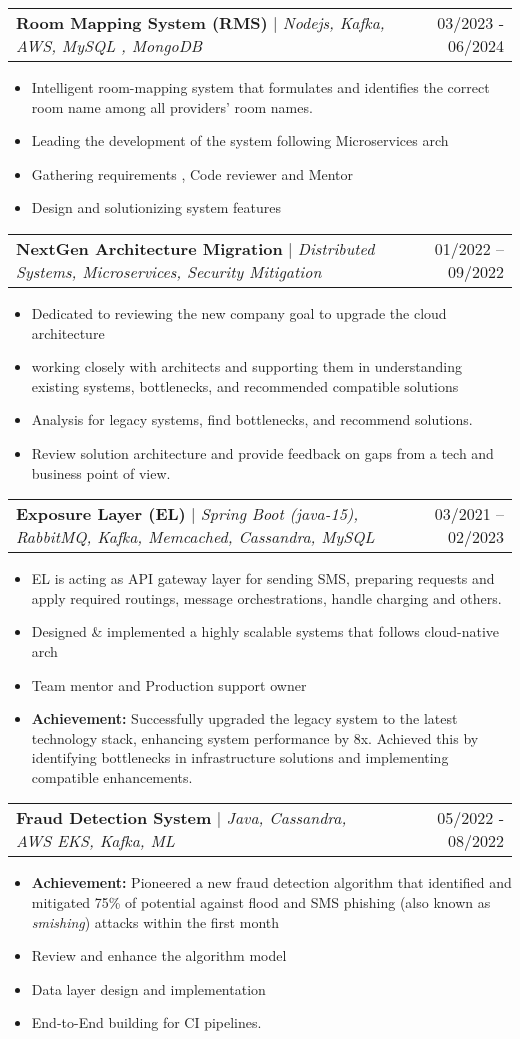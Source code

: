 \documentclass[letterpaper,11pt]{article}
\makeatletter
\newcommand{\resumeItem}[1]{
  \item\small{
    {#1 \vspace{-2pt}}
  }
}
\newcommand{\resumeProjectHeading}[2]{
    \item
    \begin{tabular*}{0.97\textwidth}{l@{\extracolsep{\fill}}r}
      \small#1 & #2 \\
    \end{tabular*}\vspace{-7pt}
}
\newcommand{\resumeItemListStart}{\begin{itemize}}
\newcommand{\resumeItemListEnd}{\end{itemize}\vspace{-5pt}}
\makeatother
\begin{document}
        \resumeProjectHeading
        {\textbf{Room Mapping System (RMS)} $|$ \footnotesize\emph{Nodejs, Kafka, AWS, MySQL , MongoDB}}{03/2023 - 06/2024}
        \resumeItemListStart
            \resumeItem{Intelligent room-mapping system that formulates and identifies the correct room name among all providers' room names.}
            \resumeItem{Leading the development of the system following Microservices arch}
            \resumeItem{Gathering requirements , Code reviewer and Mentor }
            \resumeItem{Design and solutionizing system features}
          \resumeItemListEnd
    
        \resumeProjectHeading
        {\textbf{NextGen Architecture Migration} $|$ \footnotesize\emph{Distributed Systems, Microservices, Security Mitigation}}
        {01/2022 -- 09/2022}
        \resumeItemListStart
            \resumeItem{Dedicated to reviewing the new company goal to upgrade the cloud architecture}
            \resumeItem{working closely with architects and supporting them in understanding existing systems, bottlenecks, and recommended compatible solutions}
            \resumeItem{Analysis for legacy systems, find bottlenecks, and recommend solutions.}
            \resumeItem{Review solution architecture and provide feedback on gaps from a tech and business point of view. }
          \resumeItemListEnd

		\newpage
        \resumeProjectHeading
        {\textbf{Exposure Layer (EL)} $|$ \footnotesize\emph{Spring Boot (java-15), RabbitMQ, Kafka, Memcached, Cassandra, MySQL}}
        {03/2021 -- 02/2023}
        \resumeItemListStart
            \resumeItem{EL is acting as API gateway layer for sending SMS, preparing requests and apply required routings, message orchestrations, handle charging and others.}
            \resumeItem{Designed \& implemented a highly scalable systems that follows cloud-native arch}
            \resumeItem{Team mentor and Production support owner}
            \resumeItem{\textbf{Achievement:} Successfully upgraded the legacy system to the latest technology stack, enhancing system performance by 8x. Achieved this by identifying bottlenecks in infrastructure solutions and implementing compatible enhancements. }
          \resumeItemListEnd
          
      \resumeProjectHeading
        {\textbf{Fraud Detection System} $|$ \footnotesize\emph{Java, Cassandra, AWS EKS, Kafka, ML}}{05/2022 - 08/2022}
        \resumeItemListStart
            \resumeItem{\textbf{Achievement:} Pioneered a new fraud detection algorithm that identified and mitigated 75\% of potential against flood and SMS phishing (also known as \textit{smishing}) attacks within the first month}
            \resumeItem{Review and enhance the algorithm model}
            \resumeItem{Data layer design and implementation}
            \resumeItem{End-to-End building for CI pipelines.}
        \resumeItemListEnd
\end{document}
